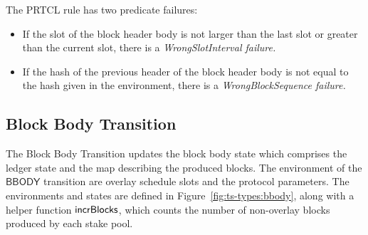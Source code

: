 The PRTCL rule has two predicate failures:
\begin{itemize}
\item If the slot of the block header body is not larger than the last slot or
  greater than the current slot, there is a \em{WrongSlotInterval} failure.
\item If the hash of the previous header of the block header body is not equal
  to the hash given in the environment, there is a \em{WrongBlockSequence}
  failure.
\end{itemize}

\clearpage

\subsection{Block Body Transition}
\label{sec:block-body-trans}

The Block Body Transition updates the block body state which comprises the ledger state and the
map describing the produced blocks.
The environment of the $\mathsf{BBODY}$ transition are overlay schedule slots and the protocol
parameters.
The environments and states are defined in Figure~\ref{fig:ts-types:bbody}, along with
a helper function $\mathsf{incrBlocks}$, which counts the number of non-overlay blocks
produced by each stake pool.

